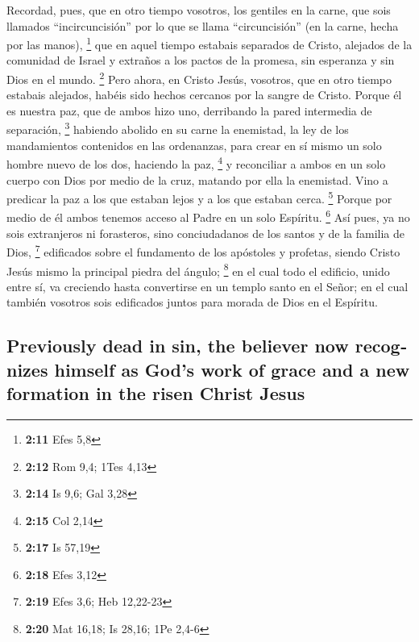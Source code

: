\begin{paracol}{2}
 Recordad, pues, que en otro tiempo vosotros, los
gentiles en la carne, que sois llamados ``incircuncisión'' por lo que se
llama ``circuncisión'' (en la carne, hecha por las manos), \footnote{\textbf{2:11}
  Efes 5,8}  que en aquel tiempo estabais separados de
Cristo, alejados de la comunidad de Israel y extraños a los pactos de la
promesa, sin esperanza y sin Dios en el mundo. \footnote{\textbf{2:12}
  Rom 9,4; 1Tes 4,13}  Pero ahora, en Cristo Jesús,
vosotros, que en otro tiempo estabais alejados, habéis sido hechos
cercanos por la sangre de Cristo.  Porque él es nuestra
paz, que de ambos hizo uno, derribando la pared intermedia de
separación, \footnote{\textbf{2:14} Is 9,6; Gal 3,28} 
habiendo abolido en su carne la enemistad, la ley de los mandamientos
contenidos en las ordenanzas, para crear en sí mismo un solo hombre
nuevo de los dos, haciendo la paz, \footnote{\textbf{2:15} Col 2,14}
 y reconciliar a ambos en un solo cuerpo con Dios por
medio de la cruz, matando por ella la enemistad.  Vino a
predicar la paz a los que estaban lejos y a los que estaban cerca.
\footnote{\textbf{2:17} Is 57,19}  Porque por medio de él
ambos tenemos acceso al Padre en un solo Espíritu. \footnote{\textbf{2:18}
  Efes 3,12}  Así pues, ya no sois extranjeros ni
forasteros, sino conciudadanos de los santos y de la familia de Dios,
\footnote{\textbf{2:19} Efes 3,6; Heb 12,22-23} 
edificados sobre el fundamento de los apóstoles y profetas, siendo
Cristo Jesús mismo la principal piedra del ángulo; \footnote{\textbf{2:20}
  Mat 16,18; Is 28,16; 1Pe 2,4-6}  en el cual todo el
edificio, unido entre sí, va creciendo hasta convertirse en un templo
santo en el Señor;  en el cual también vosotros sois
edificados juntos para morada de Dios en el Espíritu.

\switchcolumn
\begin{otherlanguage}{english}

\hypertarget{previously-dead-in-sin-the-believer-now-recognizes-himself-as-gods-work-of-grace-and-a-new-formation-in-the-risen-christ-jesus}{%
\subsection{Previously dead in sin, the believer now recognizes himself
as God's work of grace and a new formation in the risen Christ
Jesus}\label{previously-dead-in-sin-the-believer-now-recognizes-himself-as-gods-work-of-grace-and-a-new-formation-in-the-risen-christ-jesus}}


\end{otherlanguage}
\end{paracol}
